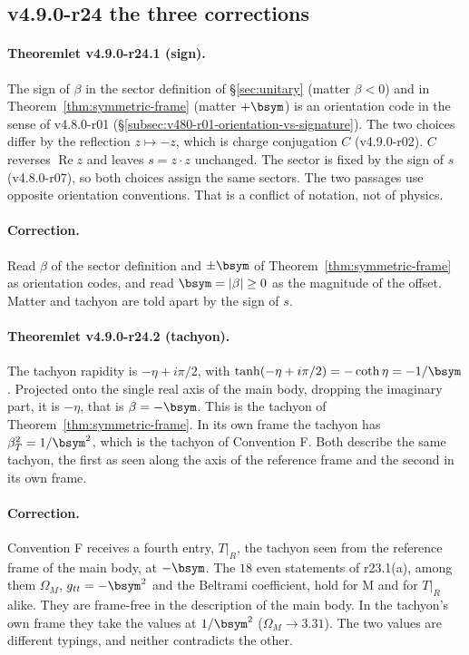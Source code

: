 \subsection*{v4.9.0-r24 the three corrections}
\label{subsec:v490-r24-corrections}

\paragraph{Theoremlet v4.9.0-r24.1 (sign).}
The sign of \(\beta\) in the sector definition of \S\ref{sec:unitary} (matter \(\beta<0\)) and in Theorem~\ref{thm:symmetric-frame}
(matter \(+\bsym\)) is an orientation code in the sense of v4.8.0-r01
(\S\ref{subsec:v480-r01-orientation-vs-signature}).  The two choices differ by the reflection \(z\mapsto-z\), which is charge
conjugation \(C\) (v4.9.0-r02).  \(C\) reverses \(\operatorname{Re}z\) and leaves \(s=z\cdot z\) unchanged.  The sector is fixed by the sign
of \(s\) (v4.8.0-r07), so both choices assign the same sectors.  The two passages use opposite orientation conventions.  That is
a conflict of notation, not of physics.

\paragraph{Correction.}
Read \(\beta\) of the sector definition and \(\pm\bsym\) of Theorem~\ref{thm:symmetric-frame} as orientation codes, and read
\(\bsym=|\beta|\ge0\) as the magnitude of the offset.  Matter and tachyon are told apart by the sign of \(s\).

\paragraph{Theoremlet v4.9.0-r24.2 (tachyon).}
The tachyon rapidity is \(-\eta+i\pi/2\), with \(\tanh(-\eta+i\pi/2)=-\coth\eta=-1/\bsym\).  Projected onto the single real axis of the
main body, dropping the imaginary part, it is \(-\eta\), that is \(\beta=-\bsym\).  This is the tachyon of
Theorem~\ref{thm:symmetric-frame}.  In its own frame the tachyon has \(\beta_T^2=1/\bsym^2\), which is the tachyon of Convention F.
Both describe the same tachyon, the first as seen along the axis of the reference frame and the second in its own frame.

\paragraph{Correction.}
Convention F receives a fourth entry, \(T|_R\), the tachyon seen from the reference frame of the main body, at \(-\bsym\).  The \(18\)
even statements of r23.1(a), among them \(\Omega_M\), \(g_{tt}=-\bsym^2\) and the Beltrami coefficient, hold for M and for \(T|_R\)
alike.  They are frame-free in the description of the main body.  In the tachyon's own frame they take the values at
\(1/\bsym^2\) (\(\Omega_M\to3.31\)).  The two values are different typings, and neither contradicts the other.


